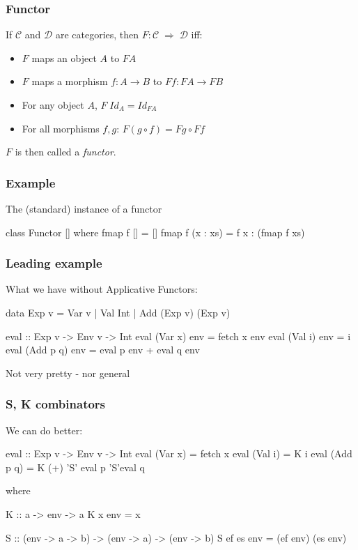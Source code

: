 \documentclass[18pt]{beamer}
\newcommand{\fto}{\;\Rightarrow\;}
\begin{document}
\begin{frame}[fragile] \frametitle{Functor}
  If $\mathcal{C}$ and $\mathcal{D}$ are categories, then $F \colon
  \mathcal{C} \fto \mathcal{D}$ iff:
  \begin{itemize}
  \item $F$ maps an object $A$ to $F A$
  \item $F$ maps a morphism $f \colon A \to B$ to $F f \colon F A \to
    F B$
  \item For any object $A$, $F \; Id_A = Id_{F A}$
  \item For all morphisms $f, g$: \quad $F (g \circ f) = F g \circ F f$
  \end{itemize}
  $F$ is then called a \emph{functor}.
\end{frame}

\begin{frame}[fragile] \frametitle{Example}
  The (standard) instance of a functor\\
  \begin{code}
    class Functor [] where
      fmap f [] = []
      fmap f (x : xs) = f x : (fmap f xs)
  \end{code}
\end{frame}

\begin{frame}[fragile] \frametitle{Leading example}
What we have without Applicative Functors:\\

\begin{code}
data Exp v = Var v
           | Val Int
           | Add (Exp v) (Exp v)

eval :: Exp v -> Env v -> Int
eval (Var x) env = fetch x env
eval (Val i) env = i
eval (Add p q) env = eval p env + eval q env
\end{code}
Not very pretty - nor general
\end{frame}

\begin{frame}[fragile] \frametitle{S, K combinators}
We can do better:\\
\begin{code}
eval :: Exp v -> Env v -> Int
eval (Var x) = fetch x
eval (Val i) = K i
eval (Add p q) = K (+) 'S' eval p 'S'eval q
\end{code}
where\\
\begin{code}
K :: a -> env -> a
K x env = x

S :: (env -> a -> b)
         -> (env -> a) -> (env -> b)
S ef es env = (ef env) (es env)
\end{code}
\end{frame}
\end{document}
